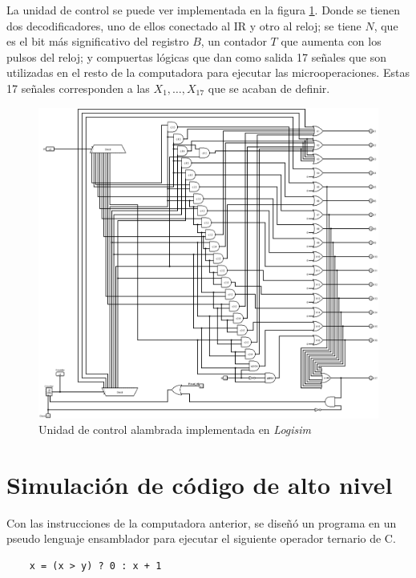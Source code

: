 \documentclass{article}
\begin{document}
La unidad de control se puede ver implementada en la figura \ref{fig:control_logisim}. Donde se tienen dos decodificadores, uno de ellos conectado al IR y otro al reloj; se tiene $N$, que es el bit más significativo del registro $B$, un contador $T$ que aumenta con los pulsos del reloj; y compuertas lógicas que dan como salida 17 señales que son utilizadas en el resto de la computadora para ejecutar las microoperaciones. Estas 17 señales corresponden a las $X_1, \hdots, X_{17}$ que se acaban de definir.

\begin{figure}[h]
    \centering
    \includegraphics[width=\textwidth]{img/control.png}
    \caption{Unidad de control alambrada implementada en \textit{Logisim}}
    \label{fig:control_logisim}
\end{figure}

\section{Simulación de código de alto nivel}

Con las instrucciones de la computadora anterior, se diseñó un programa en un pseudo lenguaje ensamblador para ejecutar el siguiente operador ternario de C.

\begin{verbatim}
    x = (x > y) ? 0 : x + 1    
\end{verbatim}
\end{document}
